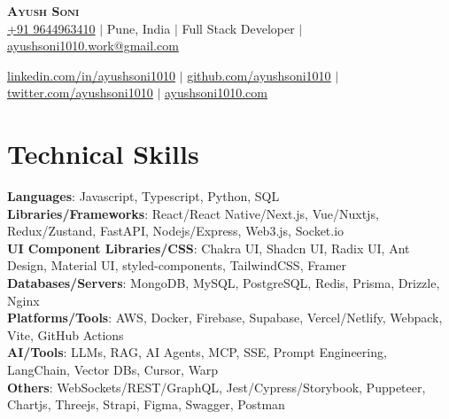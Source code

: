 \documentclass[letterpaper,10pt]{article}
\begin{document}

\begin{center}
\textbf{\Huge \scshape Ayush Soni} \\ \vspace{10pt}
\href{tel:9644963410}{+91 9644963410} $|$
{Pune, India} $|$
{Full Stack Developer} $|$
\href{mailto:ayushsoni1010.work@gmail.com}{ayushsoni1010.work@gmail.com} \\ \vspace{3pt}

\href{https://linkedin.com/in/ayushsoni1010}{\underline{linkedin.com/in/ayushsoni1010}} $|$
\href{https://github.com/ayushsoni1010}{\underline{github.com/ayushsoni1010}} $|$
\href{https://twitter.com/ayushsoni1010}{\underline{twitter.com/ayushsoni1010}} $|$
\href{https://ayushsoni1010.com}{\underline{ayushsoni1010.com}}
\end{center}



\section{Technical Skills}
\begin{itemize}[leftmargin=0.15in, label={}]
\small{\item{
      \textbf{Languages}{: \hfill Javascript, Typescript, Python, SQL } \\
      \vspace{3pt}\textbf{Libraries/Frameworks}{: \hfill React/React Native/Next.js, Vue/Nuxtjs, Redux/Zustand, FastAPI, Nodejs/Express, Web3.js, Socket.io} \\
      \vspace{3pt}\textbf{UI Component Libraries/CSS}{: \hfill Chakra UI, Shadcn UI, Radix UI, Ant Design, Material UI, styled-components, TailwindCSS, Framer} \\
      \vspace{3pt}\textbf{Databases/Servers}{: \hfill MongoDB, MySQL, PostgreSQL, Redis, Prisma, Drizzle, Nginx} \\
      \vspace{3pt}\textbf{Platforms/Tools}{: \hfill AWS, Docker, Firebase, Supabase, Vercel/Netlify, Webpack, Vite, GitHub Actions} \\
      \vspace{3pt}\textbf{AI/Tools}{: \hfill LLMs, RAG, AI Agents, MCP, SSE, Prompt Engineering, LangChain, Vector DBs, Cursor, Warp} \\
      \vspace{3pt}\textbf{Others}{: \hfill WebSockets/REST/GraphQL, Jest/Cypress/Storybook, Puppeteer, Chartjs, Threejs, Strapi, Figma, Swagger, Postman}
      }}
\end{itemize}
\end{document}
